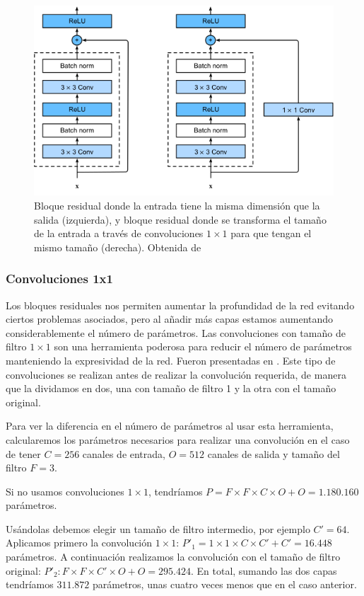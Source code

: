 \begin{figure}
    \centering
    \includegraphics[width=0.75\linewidth]{Plantilla_TFG_latex//imagenes//Inf//2.Fund/resblock1x1.png}
    \caption{Bloque residual donde la entrada tiene la misma dimensión que la salida (izquierda), y bloque residual donde se transforma el tamaño de la entrada a través de convoluciones $1\times 1$ para que tengan el mismo tamaño (derecha). Obtenida de \cite{divedeeplearning}}
    \label{fig:resblock1x1}
\end{figure}

\subsubsection{Convoluciones 1x1}


Los bloques residuales nos permiten aumentar la profundidad de la red evitando ciertos problemas asociados, pero al añadir más capas estamos aumentando considerablemente el número de parámetros. Las convoluciones con tamaño de filtro $1 \times 1$ son una herramienta poderosa para reducir el número de parámetros manteniendo la expresividad de la red. Fueron presentadas en \cite{bottleorig}. Este tipo de convoluciones se realizan antes de realizar la convolución requerida, de manera que la dividamos en dos, una con tamaño de filtro 1 y la otra con el tamaño original.

\begin{ejemplo}
	Para ver la diferencia en el número de parámetros al usar esta herramienta, calcularemos los parámetros necesarios para realizar una convolución en el caso de tener $C=256$ canales de entrada, $O=512$ canales de salida y tamaño del filtro $F=3$.
	
	Si no usamos convoluciones $1 \times 1$, tendríamos $P= F \times F \times C \times O + O = 1.180.160$ parámetros.
	
	Usándolas debemos elegir un tamaño de filtro intermedio, por ejemplo $C'=64$. Aplicamos primero la convolución $1 \times 1$: $P'_1= 1 \times 1 \times C \times C' + C'=16.448$ parámetros. A continuación realizamos la convolución con el tamaño de filtro original: $P'_2: F \times F \times C' \times O + O=295.424$. En total, sumando las dos capas tendríamos $311.872$ parámetros, unas cuatro veces menos que en el caso anterior.
\end{ejemplo}

